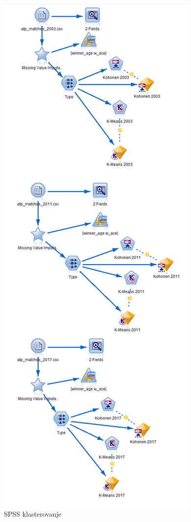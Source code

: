 \documentclass[a4paper]{article}
\begin{document}
\begin{figure}[H]
	\begin{center}
		\includegraphics[scale=0.4]{Klasterovanje/SPSS_Cvorovi.png}
	\end{center}
	\caption{SPSS klasterovanje}
	\label{fig:SPSS_CvoroviKlasterovanje}
\end{figure}
\end{document}

